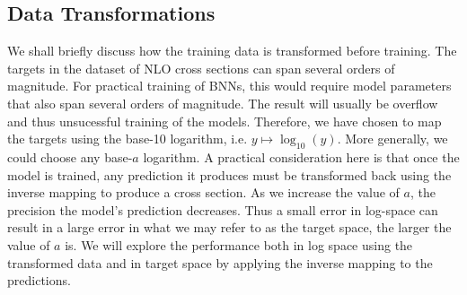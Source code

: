\subsection{Data Transformations}\label{sec:data_transform}
We shall briefly discuss how the training data is transformed before training.
The targets in the dataset of NLO cross sections can span several orders of magnitude. For practical training of BNNs, this would require
model parameters that also span several orders of magnitude. The result will usually be overflow and thus unsucessful training of the models.
Therefore, we have chosen to map the targets using the base-10 logarithm, i.e. $y \mapsto \log_{10}(y)$. More generally, we could choose any base-$a$ logarithm. A practical consideration here is that once the model is trained, any prediction it produces must be transformed back using
the inverse mapping to produce a cross section. As we increase the value of $a$, the precision the model's prediction decreases. Thus a small error in log-space 
can result in a large error in what we may refer to as the target space, the larger the value of $a$ is. 
We will explore the performance both in log space using the transformed data and in target space by applying the inverse mapping to the predictions.

